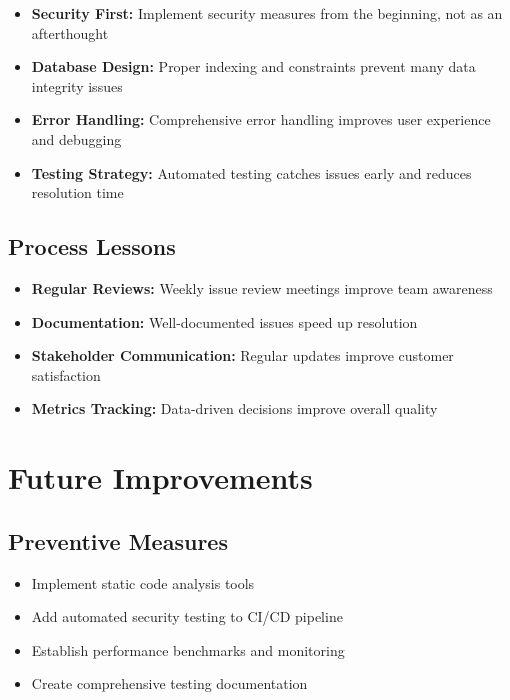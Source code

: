 \documentclass[12pt,a4paper]{article}
\begin{document}
\begin{itemize}
    \item \textbf{Security First:} Implement security measures from the beginning, not as an afterthought
    \item \textbf{Database Design:} Proper indexing and constraints prevent many data integrity issues
    \item \textbf{Error Handling:} Comprehensive error handling improves user experience and debugging
    \item \textbf{Testing Strategy:} Automated testing catches issues early and reduces resolution time
\end{itemize}

\subsection{Process Lessons}

\begin{itemize}
    \item \textbf{Regular Reviews:} Weekly issue review meetings improve team awareness
    \item \textbf{Documentation:} Well-documented issues speed up resolution
    \item \textbf{Stakeholder Communication:} Regular updates improve customer satisfaction
    \item \textbf{Metrics Tracking:} Data-driven decisions improve overall quality
\end{itemize}

\section{Future Improvements}

\subsection{Preventive Measures}

\begin{itemize}
    \item Implement static code analysis tools
    \item Add automated security testing to CI/CD pipeline
    \item Establish performance benchmarks and monitoring
    \item Create comprehensive testing documentation
\end{itemize}
\end{document}
